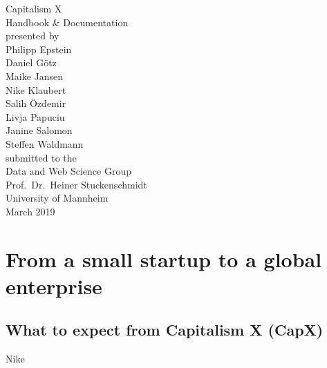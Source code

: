 \documentclass[11pt,titlepage,oneside,openany]{book}
\begin{document}
\begin{titlepage}
	\vspace*{2cm}
  \begin{center}
   {\Large Capitalism X\\}
   \vspace{2cm} 
   {Handbook \& Documentation\\}
   \vspace{2cm}
   {presented by\\
   Philipp Epstein \\
    Daniel G\"otz \\
Maike Jansen \\
Nike Klaubert \\
Salih \"Ozdemir \\
Livja Papuciu \\
Janine Salomon \\
Steffen Waldmann \\
   }
   \vspace{1cm} 
   {submitted to the\\
    Data and Web Science Group\\
    Prof.\ Dr.\ Heiner Stuckenschmidt\\
    University of Mannheim\\} \vspace{2cm}
   {March 2019}
  \end{center}
\end{titlepage} 

\tableofcontents
\newpage
\printglossary[style=long]
\listoffigures

\listoftables


\newpage

\chapter{From a small startup to a global enterprise}
\label{cha:intro}
\section{What to expect from Capitalism X (CapX)}
Nike\\
\end{document}
